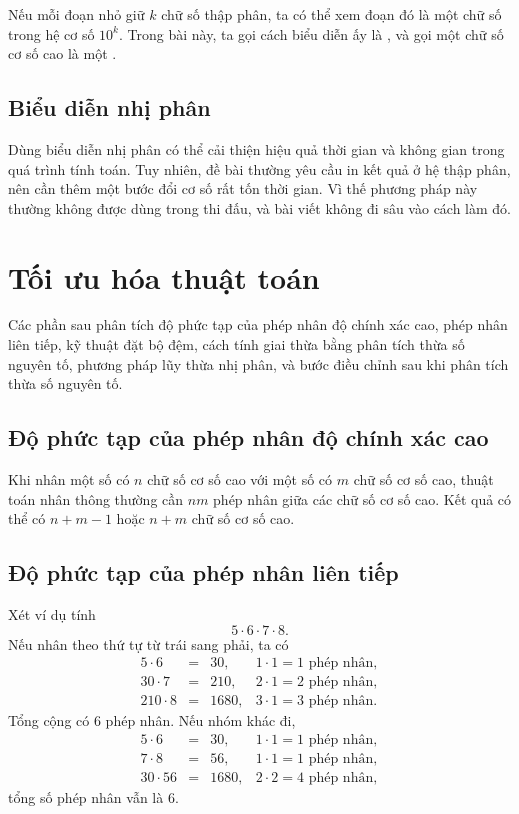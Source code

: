 \documentclass[11pt]{article}
\begin{document}
Nếu mỗi đoạn nhỏ giữ \(k\) chữ số thập phân, ta có thể xem đoạn đó là một chữ
số trong hệ cơ số \(10^k\). Trong bài này, ta gọi cách biểu diễn ấy là
, và gọi một chữ số cơ số cao là một .

\subsection{Biểu diễn nhị phân}

Dùng biểu diễn nhị phân có thể cải thiện hiệu quả thời gian và không gian
trong quá trình tính toán. Tuy nhiên, đề bài thường yêu cầu in kết quả ở hệ
thập phân, nên cần thêm một bước đổi cơ số rất tốn thời gian. Vì thế phương
pháp này thường không được dùng trong thi đấu, và bài viết không đi sâu vào
cách làm đó.

\section{Tối ưu hóa thuật toán}

Các phần sau phân tích độ phức tạp của phép nhân độ chính xác cao, phép nhân
liên tiếp, kỹ thuật đặt bộ đệm, cách tính giai thừa bằng phân tích thừa số
nguyên tố, phương pháp lũy thừa nhị phân, và bước điều chỉnh sau khi phân
tích thừa số nguyên tố.

\subsection{Độ phức tạp của phép nhân độ chính xác cao}

Khi nhân một số có \(n\) chữ số cơ số cao với một số có \(m\) chữ số cơ số
cao, thuật toán nhân thông thường cần \(n m\) phép nhân giữa các chữ số cơ số
cao. Kết quả có thể có \(n+m-1\) hoặc \(n+m\) chữ số cơ số cao.

\subsection{Độ phức tạp của phép nhân liên tiếp}

Xét ví dụ tính
\[
  5\cdot 6\cdot 7\cdot 8.
\]
Nếu nhân theo thứ tự từ trái sang phải, ta có
\[
\begin{array}{rcll}
5\cdot 6 &=& 30,   & 1\cdot 1=1 \text{ phép nhân},\\
30\cdot 7 &=& 210, & 2\cdot 1=2 \text{ phép nhân},\\
210\cdot 8 &=& 1680, & 3\cdot 1=3 \text{ phép nhân}.
\end{array}
\]
Tổng cộng có 6 phép nhân. Nếu nhóm khác đi,
\[
\begin{array}{rcll}
5\cdot 6 &=& 30, & 1\cdot 1=1 \text{ phép nhân},\\
7\cdot 8 &=& 56, & 1\cdot 1=1 \text{ phép nhân},\\
30\cdot 56 &=& 1680, & 2\cdot 2=4 \text{ phép nhân},
\end{array}
\]
tổng số phép nhân vẫn là 6.
\end{document}
